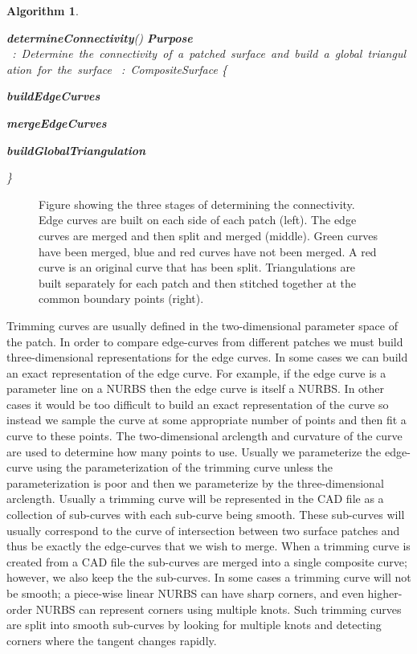 \documentclass[11pt]{article}
\newtheorem{algorithm}{Algorithm}[section]
\newcommand{\bc}[1]{\mbox{\bf#1}}   %
\newcommand{\cc}[1]{\mbox{  : #1}}  %
\begin{document}
\begin{algorithm}
\begin{programbox}
\bc{determineConnectivity}(\Cv )
\bc{Purpose} \cc{Determine the connectivity of a patched surface and build a global triangulation for the surface}
\Cv \cc{CompositeSurface}
\{\qtab

   \bc{buildEdgeCurves}

   \bc{mergeEdgeCurves}

   \bc{buildGlobalTriangulation}

\untab
\}
\end{programbox}
\end{algorithm}


\begin{figure}[hbt]
  \begin{center}
   \end{center}
\caption{Figure showing the three stages of determining the connectivity. Edge curves are built
   on each side of each patch (left). The edge curves are merged and then split and merged (middle). Green curves
  have been merged, blue and red curves have not been merged. A red curve is an original curve that has been 
split.
Triangulations are built separately for each patch and then stitched together at the common boundary points (right).}
\label{connectivity}
\end{figure}


Trimming curves are usually defined in the two-dimensional parameter
space of the patch.  In order to compare edge-curves from different
patches we must build three-dimensional representations for the edge
curves. In some cases we can build an exact representation of the edge
curve. For example, if the edge curve is a parameter line on a NURBS
then the edge curve is itself a NURBS. In other cases it would be too
difficult to build an exact representation of the curve so instead we
sample the curve at some appropriate number of points and then fit a
curve to these points. The two-dimensional arclength and curvature of
the curve are used to determine how many points to use. Usually we
parameterize the edge-curve using the parameterization of the trimming
curve unless the parameterization is poor and then we parameterize by
the three-dimensional arclength. Usually a trimming curve will be
represented in the CAD file as a collection of sub-curves with each
sub-curve being smooth. These sub-curves will usually correspond to
the curve of intersection between two surface patches and thus be
exactly the edge-curves that we wish to merge. When a trimming curve
is created from a CAD file the sub-curves are merged into a single
composite curve; however, we also keep the the sub-curves.  In some
cases a trimming curve will not be smooth; a piece-wise linear NURBS
can have sharp corners, and even higher-order NURBS can represent
corners using multiple knots. Such trimming curves are split into
smooth sub-curves by looking for multiple knots and detecting corners
where the tangent changes rapidly.
\end{document}
